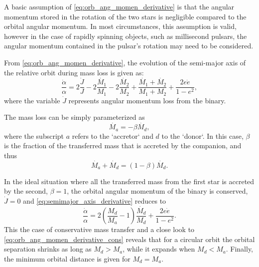 A basic assumption of \cref{eq:orb_ang_momen_derivative} is that the angular momentum stored in the rotation of the two stars is negligible compared to the orbital angular momentum. In most circumstances, this assumption is valid, however in the case of rapidly spinning objects, such as millisecond pulsars, the angular momentum contained in the pulsar's rotation may need to be considered.  

From \cref{eq:orb_ang_momen_derivative}, the evolution of the semi-major axis of the relative orbit during mass loss is given as:
\begin{equation}\label{eq:semimajor_axis_derivative}
     \frac{\dot{\alpha}}{\alpha} = 2\frac{\dot{J}}{J} - 2 \frac{\dot{M_1}}{M_1} - 2 \frac{\dot{M_2}}{M_2} + \frac{ \dot{M_1} + \dot{M_2}}{M_1 + M_2} + \frac{2e \dot{e}}{1-e^2},
\end{equation}
where the variable $\dot{J}$ represents angular momentum loss from the binary. 

The mass loss can be simply parameterized as
\begin{equation}\label{eq:mass_loss_non_cons}
    \dot{M_{a}} = - \beta \dot{M_{d}},
\end{equation}
where the subscript $a$ refers to the `accretor` and $d$ to the `donor`. In this case, $\beta$ is the fraction of the transferred mass that is accreted by the companion, and thus
\begin{equation}\label{eq:mass_loss_non_cons_2}
    \dot{M_{a}} + \dot{M_{d}} = (1-\beta) \dot{M_{d}}.
\end{equation}

In the ideal situation where all the transferred mass from the first star is accreted by the second, $\beta=1$, the orbital angular momentum of the binary is conserved, $\dot{J}=0$ and \cref{eq:semimajor_axis_derivative} reduces to
\begin{equation}\label{eq:orb_ang_momen_derivative_cons}
    \frac{\dot{\alpha}}{\alpha}= 2 \left( \frac{M_d}{M_a} - 1 \right) \frac{\dot{M_{d}}}{M_{d}} + \frac{2e \dot{e}}{1-e^2}.
\end{equation}    
This the case of conservative mass transfer and a close look to \cref{eq:orb_ang_momen_derivative_cons} reveals that for a circular orbit the orbital separation shrinks as long as $M_d > M_a$, while it expands when $M_d < M_a$. Finally, the minimum orbital distance is given for $M_d = M_a$. 

